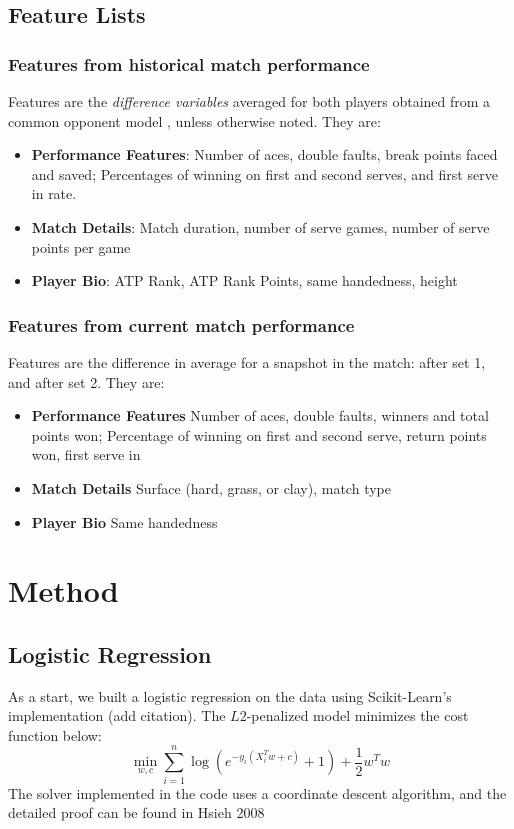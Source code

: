 \documentclass[paper=a4, fontsize=10pt]{scrartcl} %
\numberwithin{equation}{section} %
\numberwithin{figure}{section} %
\numberwithin{table}{section} %
\begin{document}
\subsection{Feature Lists}
\label{sec:feat}
\subsubsection{Features from historical match performance}
Features are the \textit{difference variables} averaged for both players obtained from a common opponent model \cite{KNOTTENBELT20123820}, unless otherwise noted. They are:
\begin{itemize}
\item \textbf{Performance Features}: Number of aces, double faults, break points faced and saved; Percentages of winning on first and second serves, and first serve in rate.
\item \textbf{Match Details}: Match duration, number of serve games, number of serve points per game
\item \textbf{Player Bio}: ATP Rank, ATP Rank Points, same handedness, height
\end{itemize}
\subsubsection{Features from current match performance}
Features are the difference in average for a snapshot in the match: after set 1, and after set 2. They are: 
\begin{itemize}
\item \textbf{Performance Features} Number of aces, double faults, winners and total points won; Percentage of winning on first and second serve, return points won, first serve in
\item \textbf{Match Details} Surface (hard, grass, or clay), match type
\item \textbf{Player Bio} Same handedness
\end{itemize}


\section{Method}
\subsection{Logistic Regression}
As a start, we built a logistic regression on the data using Scikit-Learn's implementation (add citation). The $L2$-penalized model minimizes the cost function below: $$\min_{w,c} \sum_{i=1}^n \log(e^{-y_i(X_i^Tw+c)}+1) + \frac{1}{2}w^Tw$$
The solver implemented in the code uses a coordinate descent algorithm, and the detailed proof can be found in Hsieh 2008 \cite{hsieh2008dual}
\end{document}
